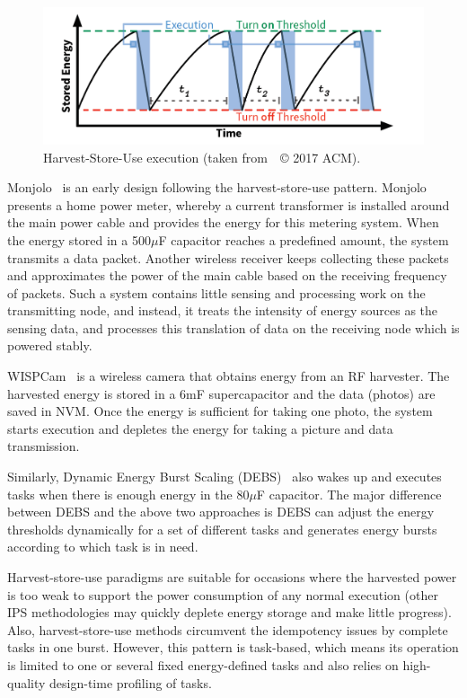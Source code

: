 \begin{figure}
    \centering
    \includegraphics[width=\columnwidth]{ch2_review/figures/saveanduse}
    \caption{Harvest-Store-Use execution (taken from~\cite{hester2017future}~© 2017 ACM).}
    \label{Figure:saveanduse}
\end{figure}

Monjolo~\cite{debruin2013monjolo} is an early design following the harvest-store-use pattern. 
Monjolo presents a home power meter, whereby a current transformer is installed around the main power cable and provides the energy for this metering system. 
When the energy stored in a 500$\mu$F capacitor reaches a predefined amount, the system transmits a data packet. Another wireless receiver keeps collecting these packets and approximates the power of the main cable based on the receiving frequency of packets. 
Such a system contains little sensing and processing work on the transmitting node, and instead, it treats the intensity of energy sources as the sensing data, and processes this translation of data on the receiving node which is powered stably.

WISPCam~\cite{naderiparizi2015wispcam} is a wireless camera that obtains energy from an RF harvester. 
The harvested energy is stored in a 6mF supercapacitor and the data (photos) are saved in NVM. 
Once the energy is sufficient for taking one photo, the system starts execution and depletes the energy for taking a picture and data transmission. 

Similarly, Dynamic Energy Burst Scaling (DEBS)~\cite{gomez2016dynamic} also wakes up and executes tasks when there is enough energy in the 80$\mu$F capacitor. 
The major difference between DEBS and the above two approaches is DEBS can adjust the energy thresholds dynamically for a set of different tasks and generates energy bursts according to which task is in need.

Harvest-store-use paradigms are suitable for occasions where the harvested power is too weak to support the power consumption of any normal execution (other IPS methodologies may quickly deplete energy storage and make little progress). 
Also, harvest-store-use methods circumvent the idempotency issues by complete tasks in one burst. 
However, this pattern is task-based, which means its operation is limited to one or several fixed energy-defined tasks and also relies on high-quality design-time profiling of tasks.

